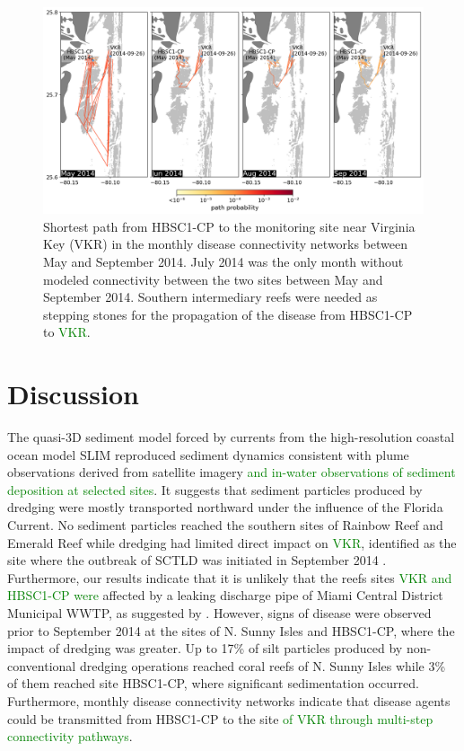 \documentclass[preprint,12pt,authoryear]{elsarticle}
\newcommand{\modif}[1]{\textcolor{green}{#1}}
\begin{document}
\begin{figure}
	\centering
	\includegraphics[width=\textwidth]{figures/fig_paths_new.png}
	\caption{Shortest path from HBSC1-CP to the monitoring site near Virginia Key (VKR) in the monthly disease connectivity networks between May and September 2014. July 2014 was the only month without modeled connectivity between the two sites between May and September 2014. Southern intermediary reefs were needed as stepping stones for the propagation of the disease from HBSC1-CP to \modif{VKR}.}
	\label{fig:onset_path}
\end{figure}

\section{Discussion}

The quasi-3D sediment model forced by currents from the high-resolution coastal ocean model SLIM reproduced sediment dynamics consistent with plume observations derived from satellite imagery \modif{and in-water observations of sediment deposition at selected sites}. It suggests that sediment particles produced by dredging were mostly transported northward under the influence of the Florida Current. No sediment particles reached the southern sites of Rainbow Reef and Emerald Reef while dredging had limited direct impact on \modif{VKR}, identified as the site where the outbreak of SCTLD was initiated in September 2014 \citep{precht2016unprecedented}. Furthermore, our results indicate that it is unlikely that the reefs sites \modif{VKR and HBSC1-CP were} affected by a leaking discharge pipe of Miami Central District Municipal WWTP, as suggested by \cite{gintert2019regional}. However, signs of disease were observed prior to September 2014 at the sites of N. Sunny Isles and HBSC1-CP, where the impact of dredging was greater. Up to 17\% of silt particles produced by non-conventional dredging operations reached coral reefs of N. Sunny Isles while 3\% of them reached site HBSC1-CP, where significant sedimentation occurred. Furthermore, monthly disease connectivity networks indicate that disease agents could be transmitted from HBSC1-CP to the site \modif{of VKR through multi-step connectivity pathways}.   
\end{document}
